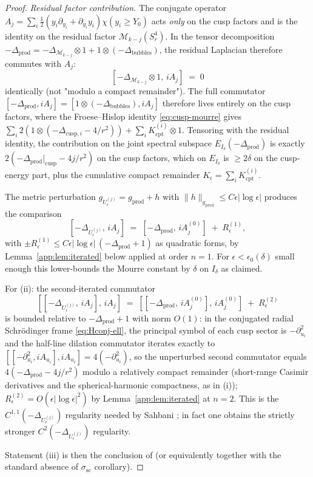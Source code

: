 \documentclass[11pt,letterpaper]{article}
\theoremstyle{definition}
\newcommand{\cM}{\mathcal{M}}
\newcommand{\Lap}{\Delta}
\begin{document}
\begin{proof}
\smallskip
\noindent\emph{Residual factor contribution.} The conjugate operator $A_j = \sum_i \tfrac12(y_i\partial_{y_i}+\partial_{y_i}y_i)\chi(y_i\ge Y_0)$ acts \emph{only} on the cusp factors and is the identity on the residual factor $\cM_{k-j}(S^4_r)$. In the tensor decomposition $-\Lap_{\mathrm{prod}} = -\Lap_{\cM_{k-j}}\otimes 1 + 1\otimes(-\Lap_{\mathrm{bubbles}})$, the residual Laplacian therefore commutes with $A_j$:
\[
[-\Lap_{\cM_{k-j}}\otimes 1,\, iA_j] \;=\; 0
\]
identically (not "modulo a compact remainder"). The full commutator $[-\Lap_{\mathrm{prod}}, iA_j] = [1\otimes(-\Lap_{\mathrm{bubbles}}), iA_j]$ therefore lives entirely on the cusp factors, where the Froese--Hislop identity \eqref{eq:cusp-mourre} gives $\sum_i 2(1\otimes(-\Lap_{\mathrm{cusp},i}-4/r^2)) + \sum_i K_{\mathrm{cpt}}^{(i)}\otimes 1$. Tensoring with the residual identity, the contribution on the joint spectral subspace $E_{I_\delta}(-\Lap_{\mathrm{prod}})$ is exactly $2(-\Lap_{\mathrm{prod}}|_{\mathrm{cusp}} - 4j/r^2)$ on the cusp factors, which on $E_{I_\delta}$ is $\ge 2\delta$ on the cusp-energy part, plus the cumulative compact remainder $K_\epsilon = \sum_i K_{\mathrm{cpt}}^{(i)}$.

The metric perturbation $g_{U_\epsilon^{(j)}} = g_{\mathrm{prod}} + h$ with $\|h\|_{g_{\mathrm{prod}}}\le C\epsilon|\log\epsilon|$ produces the comparison
\[
[-\Lap_{U_\epsilon^{(j)}},\,iA_j]\;=\;[-\Lap_{\mathrm{prod}},\,iA_j^{(0)}] \;+\; R_\epsilon^{(1)},
\]
with $\pm R_\epsilon^{(1)} \le C\epsilon|\log\epsilon|\,(-\Lap_{\mathrm{prod}}+1)$ as quadratic forms, by Lemma~\ref{app:lem:iterated} below applied at order $n=1$. For $\epsilon < \epsilon_0(\delta)$ small enough this lower-bounds the Mourre constant by $\delta$ on $I_\delta$ as claimed.

For (ii): the second-iterated commutator
\[
[[-\Lap_{U_\epsilon^{(j)}},\,iA_j],\,iA_j]\;=\;[[-\Lap_{\mathrm{prod}},\,iA_j^{(0)}],\,iA_j^{(0)}]\;+\;R_\epsilon^{(2)}
\]
is bounded relative to $-\Lap_{\mathrm{prod}}+1$ with norm $O(1)$: in the conjugated radial Schr\"odinger frame \eqref{eq:Hconj-ell}, the principal symbol of each cusp sector is $-\partial_{u_i}^2$ and the half-line dilation commutator iterates exactly to $[[-\partial_{u_i}^2, iA_{u_i}], iA_{u_i}] = 4(-\partial_{u_i}^2)$, so the unperturbed second commutator equals $4(-\Lap_{\mathrm{prod}}-4j/r^2)$ modulo a relatively compact remainder (short-range Casimir derivatives and the spherical-harmonic compactness, as in (i)); $R_\epsilon^{(2)} = O(\epsilon|\log\epsilon|^2)$ by Lemma~\ref{app:lem:iterated} at $n=2$. This is the $C^{1,1}(-\Lap_{U_\epsilon^{(j)}})$ regularity needed by Sahbani \cite[Hyp.~H1--H3, p.~411]{Sahbani1997}; in fact one obtains the strictly stronger $C^2(-\Lap_{U_\epsilon^{(j)}})$ regularity.

Statement (iii) is then the conclusion of \cite[Thm.~0.1]{Sahbani1997} (or equivalently \cite[Thm.~7.5.4]{ABMG1996} together with the standard absence of $\sigma_{\mathrm{sc}}$ corollary).
\end{proof}
\end{document}
